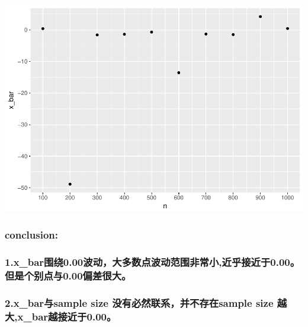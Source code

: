 \documentclass[]{article}
\begin{document}
\includegraphics{advEconometric_homework_files/figure-latex/unnamed-chunk-5-1.pdf}

\subsubsection{conclusion:}\label{conclusion-3}

\subsubsection{1.x\_bar围绕0.00波动，大多数点波动范围非常小,近乎接近于0.00。但是个别点与0.00偏差很大。}\label{xux5fbar0.000.000.00}

\subsubsection{2.x\_bar与sample size 没有必然联系，并不存在sample size
越大,x\_bar越接近于0.00。}\label{xux5fbarsample-size-sample-size-xux5fbar0.00}
\end{document}
